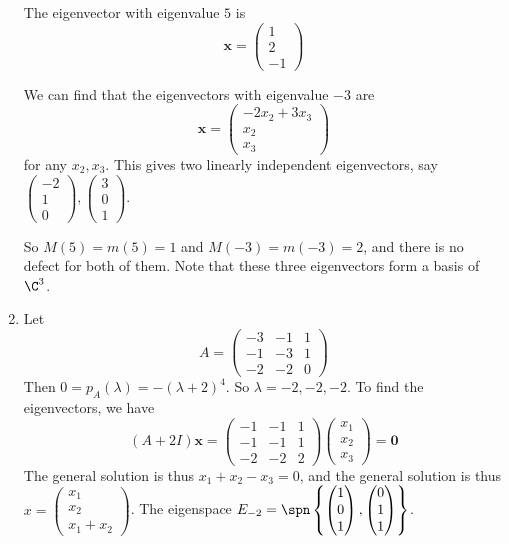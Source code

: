 \documentclass[a4paper]{article}
\begin{document}
\begin{eg}
\begin{enumerate}
      The eigenvector with eigenvalue $5$ is
      \[
        \mathbf{x} =
        \begin{pmatrix}
          1\\2\\-1
        \end{pmatrix}
      \]

      We can find that the eigenvectors with eigenvalue $-3$ are
      \[
        \mathbf{x} =
        \begin{pmatrix}
          -2x_2 + 3x_3\\x_2\\x_3
        \end{pmatrix}
      \]
      for any $x_2, x_3$. This gives two linearly independent eigenvectors, say $
      \begin{pmatrix}
        -2\\1\\0
      \end{pmatrix},
      \begin{pmatrix}
        3\\0\\1
      \end{pmatrix}$.

      So $M(5) = m(5) = 1$ and $M(-3) = m(-3) = 2$, and there is no defect for both of them. Note that these three eigenvectors form a basis of $\C^3$.
    \item Let
      \[
        A = \begin{pmatrix}
          -3&-1&1\\
          -1 & -3 & 1\\
          -2 & -2 & 0
        \end{pmatrix}
      \]
      Then $0 = p_A(\lambda) = -(\lambda+2)^4$. So $\lambda = -2, -2, -2$. To find the eigenvectors, we have
      \[
        (A + 2I)\mathbf{x} = 
        \begin{pmatrix}
          -1&-1&1\\
          -1 & -1 & 1\\
          -2 & -2 & 2
        \end{pmatrix}
        \begin{pmatrix}
          x_1\\x_2\\x_3
        \end{pmatrix}
        = \mathbf{0}
      \]
      The general solution is thus $x_1 + x_2 - x_3 = 0$, and the general solution is thus $x = 
      \begin{pmatrix}
        x_1\\x_2\\x_1 + x_2
      \end{pmatrix}$. The eigenspace $E_{-2} = \spn\left\{
        \begin{pmatrix}
          1\\0\\1
        \end{pmatrix}, 
        \begin{pmatrix}
          0\\1\\1
        \end{pmatrix}\right\}$.


\end{enumerate}
\end{eg}
\end{document}
